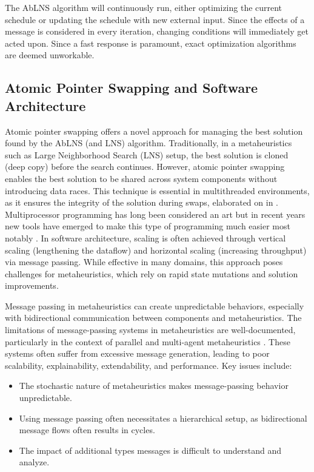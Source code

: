 The AbLNS algorithm will continuously run, either optimizing the current
schedule or updating the schedule with new external input. Since the
effects of a message is considered in every iteration, changing conditions
will immediately get acted upon. Since a fast response is paramount, exact
optimization algorithms are deemed unworkable.

\subsection{Atomic Pointer Swapping and Software Architecture}
Atomic pointer swapping offers a novel approach for managing the best
solution found by the AbLNS (and LNS) algorithm.
Traditionally, in a metaheuristics such as Large Neighborhood Search (LNS)
setup, the best solution is cloned (deep copy) before the search continues. However, atomic
pointer swapping enables the best solution to be shared across system components
without introducing data races. This technique is essential in multithreaded
environments, as it ensures the integrity of the solution during swaps, elaborated on in 
\citep{herlihy2020art}. Multiprocessor programming has long been considered an art but 
in recent years new tools have emerged to make this type of programming much 
easier most notably \citep{noauthor_rust_nodate}. In
software architecture, scaling is often achieved through vertical scaling
(lengthening the dataflow) and horizontal scaling (increasing throughput)
via message passing. While effective in many domains, this approach poses
challenges for metaheuristics, which rely on rapid state mutations and solution
improvements.

Message passing in metaheuristics can create unpredictable behaviors, especially
with bidirectional communication between components and metaheuristics. The
limitations of message-passing systems in metaheuristics are well-documented,
particularly in the context of parallel and multi-agent metaheuristics
\citep{talbiMetaheuristicsDesignImplementation2009}. These systems often suffer
from excessive message generation, leading to poor scalability, explainability,
extendability, and performance. Key issues include:

\begin{itemize} 
	\item The stochastic nature
		of metaheuristics makes message-passing behavior unpredictable. 
	\item Using message passing often necessitates a
		hierarchical setup, as bidirectional message flows often results in cycles. 
	\item The
		impact of additional types messages is difficult to understand and analyze. 
\end{itemize}

